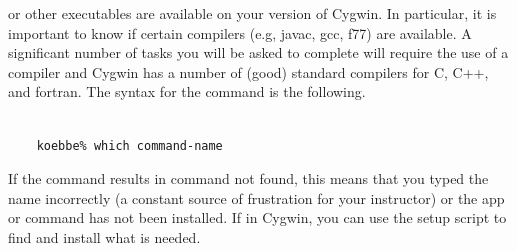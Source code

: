 \documentclass[10pt,fleqn]{article}
\begin{document}
or other executables are available on your version of Cygwin. In particular, it
is important to know if certain compilers (e.g, javac, gcc, f77) are available.
A significant number of tasks you will be asked to complete will require the use
of a compiler and Cygwin has a number of (good) standard compilers for C, C++,
and fortran. The syntax for the command is the following.
\begin{verbatim}

    koebbe% which command-name

\end{verbatim}
If the command results in command not found, this means that you typed the name
incorrectly (a constant source of frustration for your instructor) or the app
or command has not been installed. If in Cygwin, you can use the setup script to
find and install what is needed.
\end{document}

